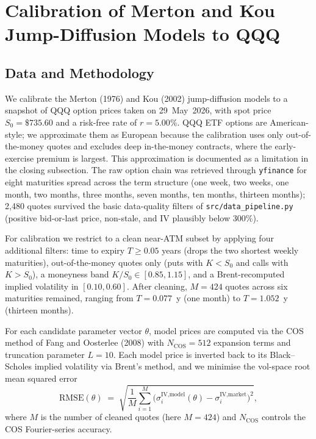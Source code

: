 \documentclass[12pt]{article}
\begin{document}
\section*{Calibration of Merton and Kou Jump-Diffusion Models to QQQ}

\subsection*{Data and Methodology}

We calibrate the Merton (1976) and Kou (2002) jump-diffusion models to a
snapshot of QQQ option prices taken on 29~May~2026, with spot price
$S_0 = \$735.60$ and a risk-free rate of $r = 5.00\%$. QQQ ETF options
are American-style; we approximate them as European because the
calibration uses only out-of-the-money quotes and excludes deep
in-the-money contracts, where the early-exercise premium is largest.
This approximation is documented as a limitation in the closing
subsection. The raw option chain was retrieved through
\texttt{yfinance} for eight maturities spread across the term structure
(one week, two weeks, one month, two months, three months, seven
months, ten months, thirteen months); 2{,}480 quotes survived the
basic data-quality filters of \texttt{src/data\_pipeline.py} (positive
bid-or-last price, non-stale, and IV plausibly below 300\%).

For calibration we restrict to a clean near-ATM subset by applying four
additional filters: time to expiry $T \geq 0.05$ years (drops the two
shortest weekly maturities), out-of-the-money quotes only (puts with
$K < S_0$ and calls with $K > S_0$), a moneyness band $K/S_0 \in
[0.85, 1.15]$, and a Brent-recomputed implied volatility in $[0.10,
0.60]$. After cleaning, $M = 424$ quotes across six maturities
remained, ranging from $T = 0.077$~y (one month) to $T = 1.052$~y
(thirteen months).

For each candidate parameter vector $\theta$, model prices are computed
via the COS method of Fang and Oosterlee (2008) with
$N_{\text{COS}} = 512$ expansion terms and truncation parameter
$L = 10$. Each model price is inverted back to its Black--Scholes
implied volatility via Brent's method, and we minimise the vol-space
root mean squared error
\[
   \text{RMSE}(\theta) \;=\;
   \sqrt{\frac{1}{M}\sum_{i=1}^{M}
            \bigl( \sigma^{\text{IV},\text{model}}_i(\theta)
                   - \sigma^{\text{IV},\text{market}}_i \bigr)^{\!2}},
\]
where $M$ is the number of cleaned quotes (here $M = 424$) and
$N_{\text{COS}}$ controls the COS Fourier-series accuracy.
\end{document}
